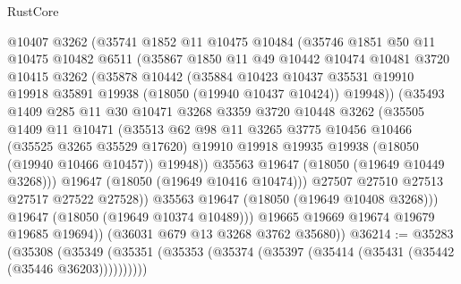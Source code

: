 \begin{lexlean}{RustCore}
\begin{coremodule}
              @10407
              @3262
              (@35741
                @1852
                @11
                @10475
                @10484
                (@35746
                  @1851
                  @50
                  @11
                  @10475
                  @10482
                  @6511
                  (@35867
                    @1850
                    @11
                    @49
                    @10442
                    @10474
                    @10481
                    @3720
                    @10415
                    @3262
                    (@35878
                      @10442
                      (@35884
                        @10423
                        @10437
                        @35531
                        @19910
                        @19918
                        @35891
                        @19938
                        (@18050 (@19940 @10437 @10424))
                        @19948))
                    (@35493
                      @1409
                      @285
                      @11
                      @30
                      @10471
                      @3268
                      @3359
                      @3720
                      @10448
                      @3262
                      (@35505
                        @1409
                        @11
                        @10471
                        (@35513
                          @62
                          @98
                          @11
                          @3265
                          @3775
                          @10456
                          @10466
                          (@35525 @3265 @35529 @17620)
                          @19910
                          @19918
                          @19935
                          @19938
                          (@18050 (@19940 @10466 @10457))
                          @19948))
                      @35563
                      @19647
                      (@18050 (@19649 @10449 @3268)))
                    @19647
                    (@18050 (@19649 @10416 @10474)))
                  @27507
                  @27510
                  @27513
                  @27517
                  @27522
                  @27528))
              @35563
              @19647
              (@18050 (@19649 @10408 @3268)))
            @19647
            (@18050 (@19649 @10374 @10489)))
          @19665
          @19669
          @19674
          @19679
          @19685
          @19694))
      (@36031 @679 @13 @3268 @3762 @35680))
@36214 := @35283
    (@35308 (@35349 (@35351 (@35353 (@35374 (@35397 (@35414 (@35431 (@35442 (@35446 @36203))))))))))

\end{coremodule}
\end{lexlean}
